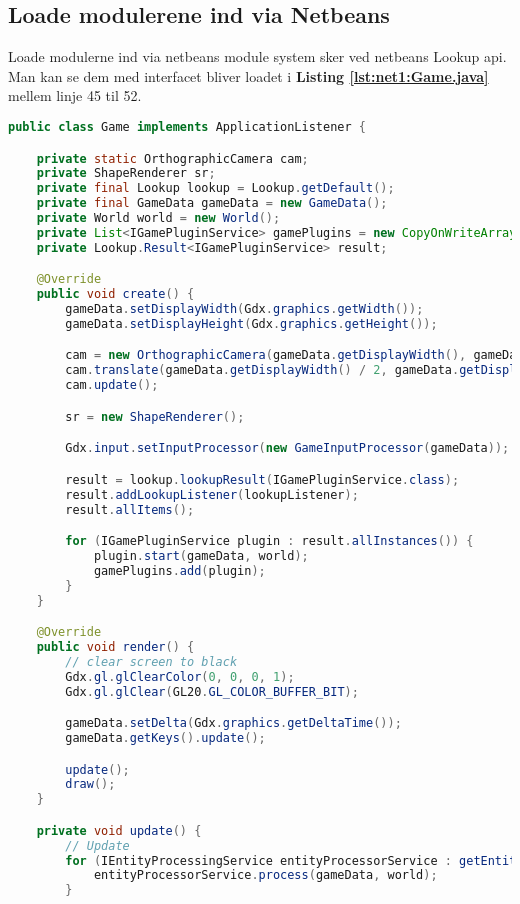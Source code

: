 \subsection{Loade modulerene ind via Netbeans}
Loade modulerne ind via netbeans module system sker ved netbeans Lookup api.
Man kan se dem med interfacet  bliver loadet i 
\textbf{Listing \ref{lst:net1:Game.java}} mellem linje 45 til 52.


\begin{lstlisting}[caption={dk.sdu.mmmi.cbse.core.main.Game.java}, label={lst:net1:Game.java}, language=java, firstnumber=22]
public class Game implements ApplicationListener {

    private static OrthographicCamera cam;
    private ShapeRenderer sr;
    private final Lookup lookup = Lookup.getDefault();
    private final GameData gameData = new GameData();
    private World world = new World();
    private List<IGamePluginService> gamePlugins = new CopyOnWriteArrayList<>();
    private Lookup.Result<IGamePluginService> result;

    @Override
    public void create() {
        gameData.setDisplayWidth(Gdx.graphics.getWidth());
        gameData.setDisplayHeight(Gdx.graphics.getHeight());

        cam = new OrthographicCamera(gameData.getDisplayWidth(), gameData.getDisplayHeight());
        cam.translate(gameData.getDisplayWidth() / 2, gameData.getDisplayHeight() / 2);
        cam.update();

        sr = new ShapeRenderer();

        Gdx.input.setInputProcessor(new GameInputProcessor(gameData));

        result = lookup.lookupResult(IGamePluginService.class);
        result.addLookupListener(lookupListener);
        result.allItems();

        for (IGamePluginService plugin : result.allInstances()) {
            plugin.start(gameData, world);
            gamePlugins.add(plugin);
        }
    }

    @Override
    public void render() {
        // clear screen to black
        Gdx.gl.glClearColor(0, 0, 0, 1);
        Gdx.gl.glClear(GL20.GL_COLOR_BUFFER_BIT);

        gameData.setDelta(Gdx.graphics.getDeltaTime());
        gameData.getKeys().update();

        update();
        draw();
    }

    private void update() {
        // Update
        for (IEntityProcessingService entityProcessorService : getEntityProcessingServices()) {
            entityProcessorService.process(gameData, world);
        }


\end{lstlisting}

